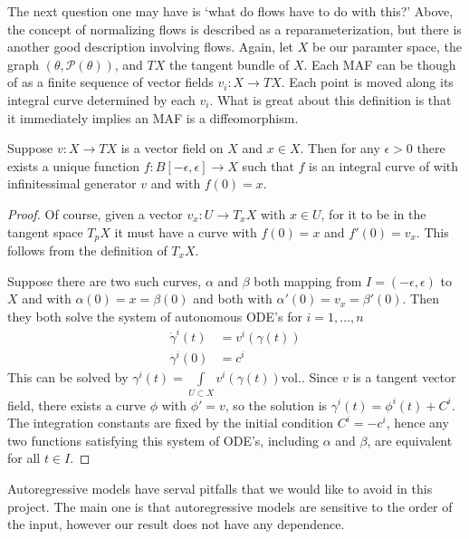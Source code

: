 The next question one may have is `what do flows have to do with this?' Above, the concept of normalizing flows is described as a reparameterization, but there is another good description involving flows. Again, let $X$ be our paramter space, the graph $(\theta,\mathcal{P}(\theta))$, and $TX$ the tangent bundle of $X$. Each MAF can be though of as a finite sequence of vector fields $v_i:X \rightarrow TX$. Each point is moved along its integral curve determined by each $v_i$. What is great about this definition is that it immediately implies an MAF is a diffeomorphism. 
\begin{prop}
Suppose $v:X \rightarrow TX$ is a vector field on $X$ and $x \in X$. Then for any $\epsilon>0$ there exists a unique function $f:B[-\epsilon,\epsilon]\rightarrow X$ such that $f$ is an integral curve of with infinitessimal generator $v$ and with $f(0) = x$.  
\end{prop}
\begin{proof}
Of course, given a vector $v_x:U\rightarrow T_x X$ with $x\in U$, for it to be in the tangent space $T_pX$ it must have a curve with $f(0)=x$ and $f'(0)=v_x$. This follows from the definition of $T_xX$.

Suppose there are two such curves, $\alpha$ and $\beta$ both mapping from $I=(-\epsilon,\epsilon)$ to $X$ and with $\alpha(0) = x = \beta(0)$ and both with $\alpha'(0) = v_x = \beta'(0)$. Then they both solve the system of autonomous ODE's for $i=1,\dots,n$
\begin{equation}
\begin{split}
	\dot{\gamma}^i(t) &= v^i(\gamma(t)) \\
	\gamma^i(0) &= c^i
\end{split}
\end{equation}
This can be solved by $\gamma^i(t) = \int\limits_{U\subset X}v^i(\gamma(t))\text{vol.}$. Since $v$ is a tangent vector field, there exists a curve $\phi$ with $\phi' = v$, so the solution is $\gamma^i(t) = \phi^i(t)+C^i$. The integration constants are fixed by the initial condition $C^i=-c^i$, hence any two functions satisfying this system of ODE's, including $\alpha$ and $\beta$, are equivalent for all $t\in I$.
\end{proof}

Autoregressive models have serval pitfalls that we would like to avoid in this project. The main one is that autoregressive models are sensitive to the order of the input, however our result does not have any dependence. 

